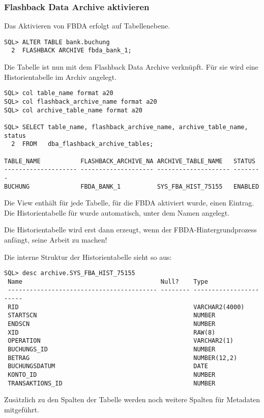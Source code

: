         \subsubsection{Flashback Data Archive aktivieren}
        \label{enablefbda}
          Das Aktivieren von FBDA erfolgt auf Tabellenebene.
          \begin{lstlisting}[caption={Flashback Data Archive aktivieren},label=admin1728,language=oracle_sql]
SQL> ALTER TABLE bank.buchung
  2  FLASHBACK ARCHIVE fbda_bank_1;
          \end{lstlisting}
          Die Tabelle  ist nun mit dem Flashback Data Archive  verkn\"upft. F\"ur sie wird eine Historientabelle im Archiv angelegt.
          \begin{lstlisting}[caption={Wo ist die Historientabelle?},label=admin1729,language=oracle_sql,alsolanguage=sqlplus]
SQL> col table_name format a20
SQL> col flashback_archive_name format a20
SQL> col archive_table_name format a20

SQL> SELECT table_name, flashback_archive_name, archive_table_name, status
  2  FROM   dba_flashback_archive_tables;

TABLE_NAME           FLASHBACK_ARCHIVE_NA ARCHIVE_TABLE_NAME   STATUS
-------------------- -------------------- -------------------- --------
BUCHUNG              FBDA_BANK_1          SYS_FBA_HIST_75155   ENABLED
          \end{lstlisting}
          Die View  enth\"alt f\"ur jede Tabelle, f\"ur die FBDA aktiviert wurde, einen Eintrag. Die Historientabelle f\"ur  wurde automatisch, unter dem Namen  angelegt.
          \begin{merke}
            Die Historientabelle wird erst dann erzeugt, wenn der FBDA-Hintergrundprozess anf\"angt, seine Arbeit zu machen!
          \end{merke}
          Die interne Struktur der Historientabelle sieht so aus:
          \begin{lstlisting}[caption={Die Struktur der Historientabelle},label=admin1730,emph={[9]VARCHAR2,NUMBER,RAW,DATE},emphstyle={[9]\color{black}},language=oracle_sql,alsolanguage=sqlplus]
SQL> desc archive.SYS_FBA_HIST_75155
 Name                                      Null?    Type
 ----------------------------------------- -------- -----------------------
 RID                                                VARCHAR2(4000)
 STARTSCN                                           NUMBER
 ENDSCN                                             NUMBER
 XID                                                RAW(8)
 OPERATION                                          VARCHAR2(1)
 BUCHUNGS_ID                                        NUMBER
 BETRAG                                             NUMBER(12,2)
 BUCHUNGSDATUM                                      DATE
 KONTO_ID                                           NUMBER
 TRANSAKTIONS_ID                                    NUMBER
          \end{lstlisting}
          Zus\"atzlich zu den Spalten der Tabelle  werden noch weitere Spalten f\"ur Metadaten mitgef\"uhrt.

